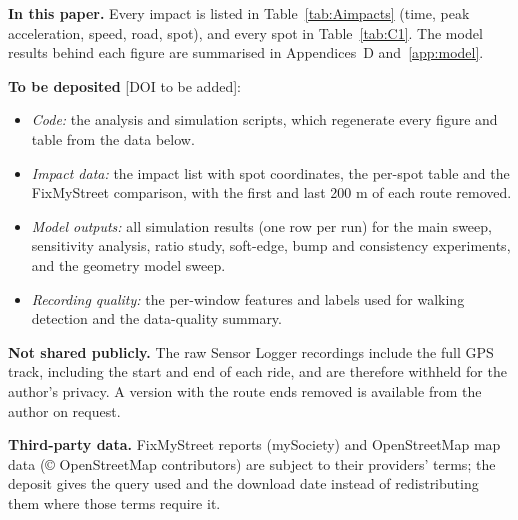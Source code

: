\textbf{In this paper.} Every impact is listed in Table~\ref{tab:Aimpacts} (time, peak
acceleration, speed, road, spot), and every spot in Table~\ref{tab:C1}. The model results
behind each figure are summarised in Appendices~D and~\ref{app:model}.

\textbf{To be deposited} [DOI to be added]:
\begin{itemize}
\item \emph{Code:} the analysis and simulation scripts, which regenerate every figure and
  table from the data below.
\item \emph{Impact data:} the impact list with spot coordinates, the per-spot table and the
  FixMyStreet comparison, with the first and last 200 m of each route removed.
\item \emph{Model outputs:} all simulation results (one row per run) for the main sweep,
  sensitivity analysis, ratio study, soft-edge, bump and consistency experiments, and the
  geometry model sweep.
\item \emph{Recording quality:} the per-window features and labels used for walking
  detection and the data-quality summary.
\end{itemize}

\textbf{Not shared publicly.} The raw Sensor Logger recordings include the full GPS track,
including the start and end of each ride, and are therefore withheld for the author's
privacy. A version with the route ends removed is available from the author on request.

\textbf{Third-party data.} FixMyStreet reports (mySociety) and OpenStreetMap map data
(\copyright{} OpenStreetMap contributors) are subject to their providers' terms; the
deposit gives the query used and the download date instead of redistributing them where
those terms require it.
